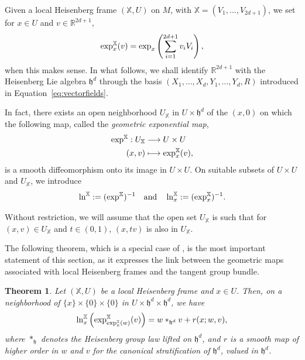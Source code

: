 \documentclass[12pt,a4paper]{amsart}
\theoremstyle{plain}
\newtheorem{theorem}{Theorem}[section]
\theoremstyle{definition}
\theoremstyle{remark}
\numberwithin{equation}{section}
\theoremstyle{definition}
\def\R{{\mathbb R}}%
\def \exp{{\rm exp}}
\def \bX{\mathbb{X}}
\def \fh{\mathfrak{h}}
\numberwithin{equation}{section}
\begin{document}
Given a local Heisenberg frame $(\bX,U)$ on $M$, with $\bX = (V_1,\dots,V_{2d+1})$, we set
for $x\in U$ and $v\in\R^{2d+1}$,
\begin{equation*}
    \exp_{x}^\bX(v) = \exp_x\left(\sum_{i=1}^{2d+1} v_i V_i\right),
\end{equation*}
when this makes sense. In what follows, we shall identify $\R^{2d+1}$ with the Heisenberg Lie algebra $\fh^d$ through the basis $(X_1,\dots,X_d,Y_1,\dots,Y_d,R)$ introduced in Equation~\eqref{eq:vectorfields}.

In fact, there exists an open neighborhood $U_\bX$ in $U\times \fh^d$ of the $(x,0)$ on which the following map, called the \emph{geometric exponential map},
\begin{equation*}
    \begin{aligned}
        \exp^\bX : U_\bX & \longrightarrow U \times U \\
        (x,v) & \longmapsto \exp_{x}^\bX(v),
    \end{aligned}
\end{equation*}
is a smooth diffeomorphism onto its image in $U\times U$. On suitable subsets of $U\times U$ and $U_\bX$, we introduce
\begin{equation*}
    \ln^\bX := (\exp^\bX)^{-1}\quad\mbox{and}\quad \ln_{x}^\bX := (\exp_{x}^\bX)^{-1}.
\end{equation*}

Without restriction, we will assume that the open set $U_\bX$ is such that for $(x,v)\in U_\bX$ and $t\in (0,1)$, $(x,tv)$ is also in $U_\bX$.

\vspace{0.25cm}

The following theorem, which is a special case of \cite[Theorem 4.13]{FFF24}, is the most important statement of this section, as it expresses the link between the geometric maps associated with local Heisenberg frames and the tangent group bundle.

\begin{theorem}
\label{thm:composgeomexp}
    Let $(\bX,U)$ be a local Heisenberg frame and $x\in U$. Then, on a neighborhood of $\{x\}\times\{0\}\times\{0\}$ in $U\times\fh^d\times\fh^d$, we have
    \begin{equation*}
        \ln_{x}^\bX\left(\exp_{\exp_{x}^\bX(w)}^\bX(v)\right) = w *_{\fh^d} v + r(x;w,v),
    \end{equation*}
    where $*_{\fh}$ denotes the Heisenberg group law lifted on $\fh^d$, and $r$ is a smooth map of higher order in $w$ and $v$ for the canonical stratification of $\fh^d$, valued in $\fh^d$.
\end{theorem}
\end{document}
